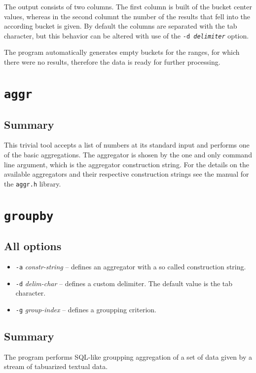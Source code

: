 \documentclass{report}
\begin{document}
	The output consists of two columns. The first column is built of the bucket
	center values, whereas in the second columnt the number of the results that
	fell into the according bucket is given. By default the columns are separated
	with the tab character, but this behavior can be altered with use of the
	\texttt{-d \textit{delimiter}} option.

	The program automatically generates empty buckets for the ranges, for which
	there were no results, therefore the data is ready for further processing.

\section{\texttt{aggr}}

	\subsection{Summary}
	This trivial tool accepts a list of numbers at its standard input and performs 
	one of the basic aggregations. The aggregator is shosen by the one and only
	command line argument, which is the aggregator construction string. For the
	details on the available aggregators and their respective construction strings
	see the manual for the \texttt{aggr.h} library.

\section{\texttt{groupby}}

	\subsection{All options}
	\begin{itemize}
		\item \texttt{-a} \textit{constr-string} -- defines an aggregator with a
			so called construction string.
		\item \texttt{-d} \textit{delim-char} -- defines a custom delimiter.
			The default value is the tab character.
		\item \texttt{-g} \textit{group-index} -- defines a groupping criterion.
	\end{itemize}

	\subsection{Summary}
	The program performs SQL-like groupping aggregation of a set of data given by a
	stream of tabuarized textual data.
\end{document}
